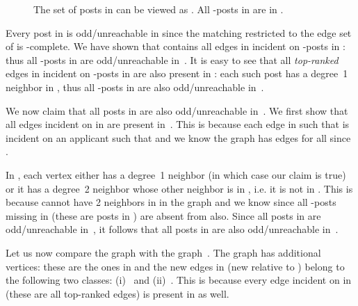 \documentclass[11pt]{llncs}
\begin{document}
\begin{figure}[h]
\centerline{}
\caption{The set of posts in  can be viewed as . 
All -posts in  are in .}
\label{fig:last-claim}
\end{figure}




Every post in  is odd/unreachable in  since the matching  restricted 
to the edge set of  is -complete. We have shown that  contains all 
edges in  incident on -posts in : thus all -posts in  
are odd/unreachable in~. It is easy to see that all {\em top-ranked} edges in 
 incident on -posts in  are also present in : each such post has 
a degree~1 neighbor in , thus all -posts in  are also odd/unreachable 
in~.

We now claim that all posts in  are also odd/unreachable in~. We first show that 
all edges incident on  in  are present in~. This is because each edge  
in  such that  is incident on an applicant  such 
that  and we know the graph  has  edges for all 
 since 
.


In , each vertex  either has a degree~1 neighbor (in which case our claim is 
true) or it has a degree~2 neighbor  whose other neighbor is in , i.e.
it is not in . This is because  cannot have 2 neighbors in  in the graph 
 and we know  since all -posts missing in  (these are posts in 
) are absent from  also. Since all posts in  
are odd/unreachable in~, it follows that all posts in  are also odd/unreachable 
in~.

\smallskip

Let us now compare the graph  with the graph~. The graph  has additional 
vertices: these are the ones in  and the new edges in  (new relative to )
 belong to the following two classes: (i)~
and (ii)~. This is because every edge incident on 
 in  (these are all top-ranked edges) is present in  as well. 
\end{document}
